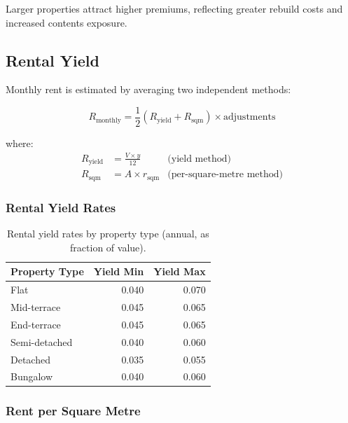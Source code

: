 \documentclass[11pt,a4paper]{article}
\begin{document}
\noindent Larger properties attract higher premiums, reflecting greater
rebuild costs and increased contents exposure.


\subsection{Rental Yield}

Monthly rent is estimated by averaging two independent methods:

\begin{equation}
\label{eq:rent}
R_{\mathrm{monthly}} = \frac{1}{2}\left(R_{\mathrm{yield}} + R_{\mathrm{sqm}}\right) \times \text{adjustments}
\end{equation}

\noindent where:
\begin{align}
R_{\mathrm{yield}} &= \frac{V \times y}{12} & \text{(yield method)} \\
R_{\mathrm{sqm}} &= A \times r_{\mathrm{sqm}} & \text{(per-square-metre method)}
\end{align}

\subsubsection{Rental Yield Rates}

\begin{table}[H]
\centering
\caption{Rental yield rates by property type (annual, as fraction of value).}
\label{tab:rental_yield}
\begin{tabular}{lrr}
\toprule
\textbf{Property Type} & \textbf{Yield Min} & \textbf{Yield Max} \\
\midrule
Flat            & 0.040 & 0.070 \\
Mid-terrace     & 0.045 & 0.065 \\
End-terrace     & 0.045 & 0.065 \\
Semi-detached   & 0.040 & 0.060 \\
Detached        & 0.035 & 0.055 \\
Bungalow        & 0.040 & 0.060 \\
\bottomrule
\end{tabular}
\end{table}

\subsubsection{Rent per Square Metre}
\end{document}
